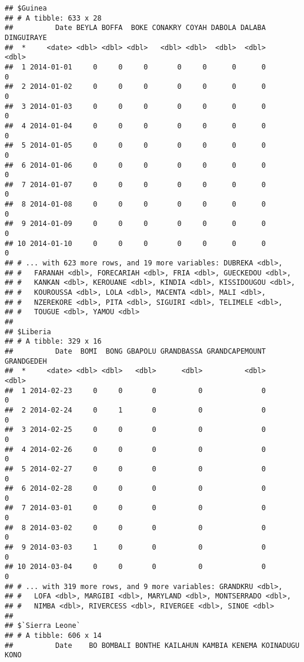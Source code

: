 \documentclass[11pt,]{article}
\begin{document}
\begin{verbatim}
## $Guinea
## # A tibble: 633 x 28
##          Date BEYLA BOFFA  BOKE CONAKRY COYAH DABOLA DALABA DINGUIRAYE
##  *     <date> <dbl> <dbl> <dbl>   <dbl> <dbl>  <dbl>  <dbl>      <dbl>
##  1 2014-01-01     0     0     0       0     0      0      0          0
##  2 2014-01-02     0     0     0       0     0      0      0          0
##  3 2014-01-03     0     0     0       0     0      0      0          0
##  4 2014-01-04     0     0     0       0     0      0      0          0
##  5 2014-01-05     0     0     0       0     0      0      0          0
##  6 2014-01-06     0     0     0       0     0      0      0          0
##  7 2014-01-07     0     0     0       0     0      0      0          0
##  8 2014-01-08     0     0     0       0     0      0      0          0
##  9 2014-01-09     0     0     0       0     0      0      0          0
## 10 2014-01-10     0     0     0       0     0      0      0          0
## # ... with 623 more rows, and 19 more variables: DUBREKA <dbl>,
## #   FARANAH <dbl>, FORECARIAH <dbl>, FRIA <dbl>, GUECKEDOU <dbl>,
## #   KANKAN <dbl>, KEROUANE <dbl>, KINDIA <dbl>, KISSIDOUGOU <dbl>,
## #   KOUROUSSA <dbl>, LOLA <dbl>, MACENTA <dbl>, MALI <dbl>,
## #   NZEREKORE <dbl>, PITA <dbl>, SIGUIRI <dbl>, TELIMELE <dbl>,
## #   TOUGUE <dbl>, YAMOU <dbl>
## 
## $Liberia
## # A tibble: 329 x 16
##          Date  BOMI  BONG GBAPOLU GRANDBASSA GRANDCAPEMOUNT GRANDGEDEH
##  *     <date> <dbl> <dbl>   <dbl>      <dbl>          <dbl>      <dbl>
##  1 2014-02-23     0     0       0          0              0          0
##  2 2014-02-24     0     1       0          0              0          0
##  3 2014-02-25     0     0       0          0              0          0
##  4 2014-02-26     0     0       0          0              0          0
##  5 2014-02-27     0     0       0          0              0          0
##  6 2014-02-28     0     0       0          0              0          0
##  7 2014-03-01     0     0       0          0              0          0
##  8 2014-03-02     0     0       0          0              0          0
##  9 2014-03-03     1     0       0          0              0          0
## 10 2014-03-04     0     0       0          0              0          0
## # ... with 319 more rows, and 9 more variables: GRANDKRU <dbl>,
## #   LOFA <dbl>, MARGIBI <dbl>, MARYLAND <dbl>, MONTSERRADO <dbl>,
## #   NIMBA <dbl>, RIVERCESS <dbl>, RIVERGEE <dbl>, SINOE <dbl>
## 
## $`Sierra Leone`
## # A tibble: 606 x 14
##          Date    BO BOMBALI BONTHE KAILAHUN KAMBIA KENEMA KOINADUGU  KONO

\end{verbatim}
\end{document}
